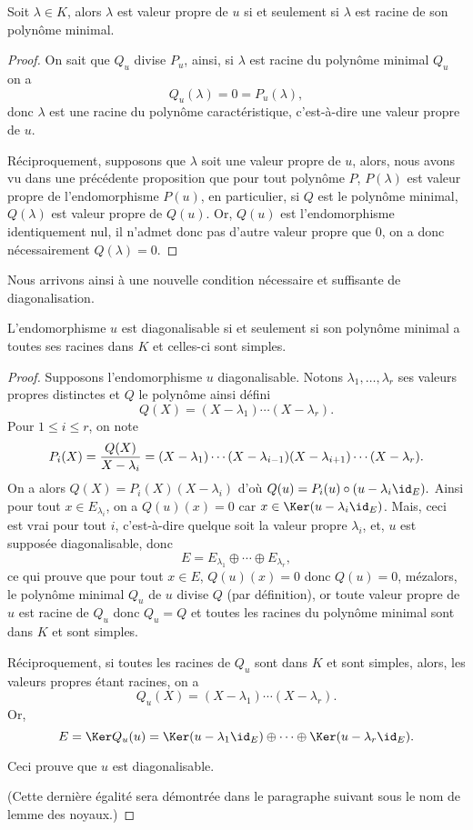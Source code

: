 \documentclass[class=report,crop=false]{standalone}
\begin{document}
\begin{proposition}
Soit $\lambda\in K$, alors $\lambda$ est valeur propre de $u$ si et seulement si $\lambda$
est racine de son polynôme minimal. 
\end{proposition} 

\begin{proof}
On sait que $Q_u$ divise $P_u$, ainsi, si $\lambda$ est racine du polynôme minimal $Q_u$ on a $$Q_u(\lambda)=0=P_u(\lambda),$$ donc $\lambda$ est  une racine du polynôme caractéristique, c'est-à-dire une valeur propre de $u$. 

Réciproquement, supposons que $\lambda$ soit une valeur propre de $u$, alors, nous avons vu dans une précédente proposition que pour tout polynôme $P$, $P(\lambda)$ est valeur propre de l'endomorphisme $P(u)$, en particulier, si $Q$ est le polynôme minimal, $Q(\lambda)$ est valeur propre de $Q(u)$. Or, $Q(u)$ est l'endomorphisme identiquement nul, il n'admet donc pas d'autre valeur propre que $0$, on a donc nécessairement $Q(\lambda)=0$. 
\end{proof}



Nous arrivons ainsi à une nouvelle condition nécessaire et suffisante de diagonalisation.


\begin{proposition}
L'endomorphisme $u$ est diagonalisable si et seulement si son polynôme minimal a toutes ses
racines dans $K$ et celles-ci sont simples. 
\end{proposition} 

\begin{proof}
Supposons l'endomorphisme $u$ diagonalisable. Notons $\lambda_1,\dots,\lambda_r$ ses valeurs propres distinctes et $Q$ le polynôme ainsi défini
$$Q(X)=(X-\lambda_1)\cdots(X-\lambda_r).$$
Pour $1\leq i\leq r$, on note 
$$P_i(X)={{Q(X)}\over{X-\lambda_i}}=(X-\lambda_1)\cdots(X-\lambda_{i-1})(X-\lambda_{i+1})\cdots(X-\lambda_r).$$
On a alors $Q(X)=P_i(X)(X-\lambda_i)$ d'où $Q(u)=P_i(u)\circ(u-\lambda_i\id_E).$
Ainsi pour tout $x\in E_{\lambda_i}$, on a $Q(u)(x)=0$ car $x\in\Ker(u-\lambda_i\id_E)$. Mais, ceci est vrai pour tout $i$, c'est-à-dire quelque soit la valeur propre $\lambda_i$, et, $u$ est supposée diagonalisable, donc $$E=E_{\lambda_1}\oplus\cdots\oplus E_{\lambda_r},$$
ce qui prouve que pour tout $x\in E$, $Q(u)(x)=0$ donc $Q(u)=0$, mézalors, le polynôme minimal $Q_u$ de $u$ divise $Q$ (par définition), or toute valeur propre de $u$ est racine de $Q_u$ donc $Q_u=Q$ et toutes les racines du polynôme minimal sont dans $K$ et sont simples.

Réciproquement, si toutes les racines de $Q_u$ sont dans $K$ et sont simples, alors, les valeurs propres étant racines, on a 
$$Q_u(X)=(X-\lambda_1)\cdots(X-\lambda_r).$$
Or, $$E=\Ker Q_u(u)=\Ker(u-\lambda_1\id_E)\oplus\cdots\oplus\Ker(u-\lambda_r\id_E).$$

Ceci prouve que $u$ est diagonalisable.

(Cette dernière égalité sera démontrée dans le paragraphe suivant sous le nom de lemme des noyaux.)
\end{proof}
\end{document}
